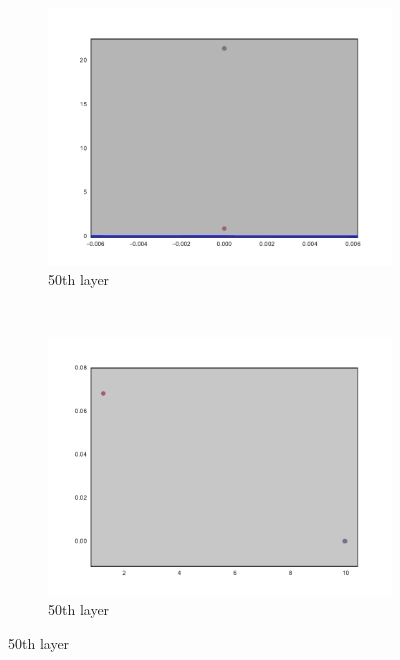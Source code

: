 \begin{figure}[h!]
    ~ %
    \begin{subfigure}[b]{0.3\textwidth}
        \includegraphics[width=\textwidth]{img/init/relu-bn/conv2d_50-0.pdf}
        \caption{\ReLUBN 50th layer}
        \label{fig:reluBNInit501}
    \end{subfigure}
    ~ %
    \begin{subfigure}[b]{0.3\textwidth}
        \includegraphics[width=\textwidth]{img/init/relu-bn/conv2d_50-2.pdf}
        \caption{\ReLUBN 50th layer}

\end{subfigure}
\end{figure}
